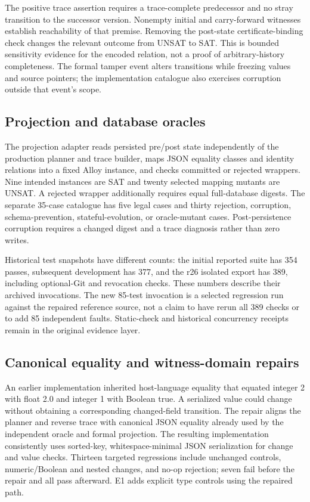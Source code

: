 \documentclass[preprint,12pt,authoryear]{elsarticle}
\begin{document}
The positive trace assertion requires a trace-complete predecessor and no stray transition to the successor version. Nonempty initial and carry-forward witnesses establish reachability of that premise. Removing the post-state certificate-binding check changes the relevant outcome from UNSAT to SAT. This is bounded sensitivity evidence for the encoded relation, not a proof of arbitrary-history completeness. The formal tamper event alters transitions while freezing values and source pointers; the implementation catalogue also exercises corruption outside that event's scope.

\subsection{Projection and database oracles}

The projection adapter reads persisted pre/post state independently of the production planner and trace builder, maps JSON equality classes and identity relations into a fixed Alloy instance, and checks committed or rejected wrappers. Nine intended instances are SAT and twenty selected mapping mutants are UNSAT. A rejected wrapper additionally requires equal full-database digests. The separate 35-case catalogue has five legal cases and thirty rejection, corruption, schema-prevention, stateful-evolution, or oracle-mutant cases. Post-persistence corruption requires a changed digest and a trace diagnosis rather than zero writes.

Historical test snapshots have different counts: the initial reported suite has 354 passes, subsequent development has 377, and the r26 isolated export has 389, including optional-Git and revocation checks. These numbers describe their archived invocations. The new 85-test invocation is a selected regression run against the repaired reference source, not a claim to have rerun all 389 checks or to add 85 independent faults. Static-check and historical concurrency receipts remain in the original evidence layer.

\subsection{Canonical equality and witness-domain repairs}

An earlier implementation inherited host-language equality that equated integer 2 with float 2.0 and integer 1 with Boolean true. A serialized value could change without obtaining a corresponding changed-field transition. The repair aligns the planner and reverse trace with canonical JSON equality already used by the independent oracle and formal projection. The resulting implementation consistently uses sorted-key, whitespace-minimal JSON serialization for change and value checks. Thirteen targeted regressions include unchanged controls, numeric/Boolean and nested changes, and no-op rejection; seven fail before the repair and all pass afterward. E1 adds explicit type controls using the repaired path.
\end{document}
